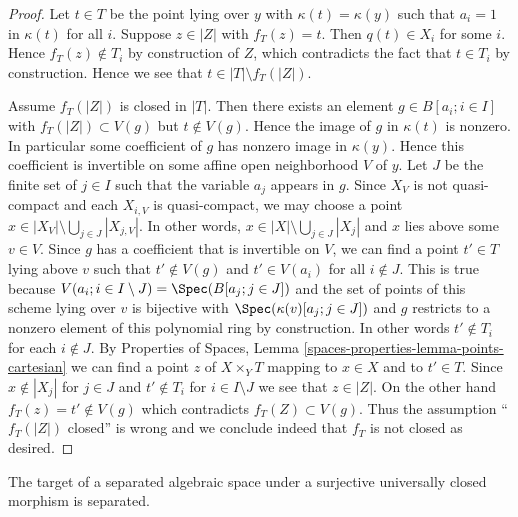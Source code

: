 \begin{proof}
\medskip\noindent
Let $t \in T$ be the point lying over $y$ with $\kappa(t) = \kappa(y)$
such that $a_i = 1$ in $\kappa(t)$ for all $i$. Suppose $z \in |Z|$ with
$f_T(z) = t$. Then $q(t) \in X_i$ for some $i$. Hence $f_T(z) \not \in T_i$
by construction of $Z$, which contradicts the fact that $t \in T_i$ by
construction. Hence we see that $t \in |T| \setminus f_T(|Z|)$.

\medskip\noindent
Assume $f_T(|Z|)$ is closed in $|T|$. Then there exists an element
$g \in B[a_i; i \in I]$ with $f_T(|Z|) \subset V(g)$ but $t \not \in V(g)$.
Hence the image of $g$ in $\kappa(t)$ is nonzero. In particular some
coefficient of $g$ has nonzero image in $\kappa(y)$. Hence this coefficient is
invertible on some affine open neighborhood $V$ of $y$. Let $J$ be the finite
set of $j \in I$ such that the variable $a_j$ appears in $g$.
Since $X_V$ is not quasi-compact and each $X_{i, V}$ is quasi-compact,
we may choose a point $x \in |X_V| \setminus \bigcup_{j \in J} |X_{j, V}|$.
In other words, $x \in |X| \setminus \bigcup_{j \in J} |X_j|$ and $x$ lies
above some $v \in V$. Since $g$ has a coefficient that is invertible on $V$,
we can find a point $t' \in T$ lying above $v$ such that $t' \not \in V(g)$ and
$t' \in V(a_i)$ for all $i \notin J$. This is true because
$V(a_i; i \in I \setminus J) = \Spec(B[a_j; j\in J])$
and the set of points of this scheme lying over $v$ is bijective
with $\Spec(\kappa(v)[a_j; j \in J])$ and $g$ restricts to
a nonzero element of this polynomial ring by construction.
In other words $t' \not \in T_i$ for each $i \not \in J$. By
Properties of Spaces, Lemma \ref{spaces-properties-lemma-points-cartesian}
we can find a point $z$ of $X \times_Y T$ mapping to $x \in X$ and to
$t' \in T$. Since $x \not \in |X_j|$ for $j \in J$ and $t' \not \in T_i$
for $i \in I \setminus J$ we see that $z \in |Z|$. On the other hand
$f_T(z) = t' \not \in V(g)$ which contradicts $f_T(Z) \subset V(g)$.
Thus the assumption ``$f_T(|Z|)$ closed'' is wrong and we conclude indeed
that $f_T$ is not closed as desired.
\end{proof}

The target of a separated algebraic space under a surjective
universally closed morphism is separated.

